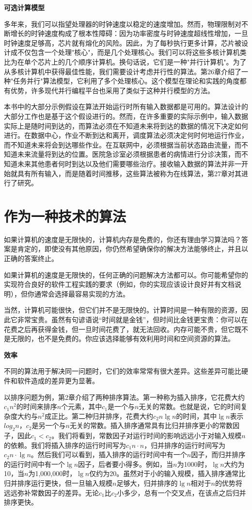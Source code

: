 \documentclass[lang=cn,newtx,10pt,scheme=chinese]{elegantbook}
\begin{document}
\textbf{可选计算模型}

多年来，我们可以指望处理器的时钟速度以稳定的速度增加。然而，物理限制对不断增长的时钟速度构成了根本性障碍：因为功率密度与时钟速度超线性增加，一旦时钟速度足够高，芯片就有熔化的风险。因此，为了每秒执行更多计算，芯片被设计成不仅包含一个处理"核心"，而是几个处理核心。我们可以将这些多核计算机类比为在单个芯片上的几个顺序计算机。换句话说，它们是一种"并行计算机"。为了从多核计算机中获得最佳性能，我们需要设计考虑并行性的算法。第26章介绍了一种"任务并行"算法模型，它利用了多个处理核心。这个模型在理论和实践的角度都有优势，许多现代并行编程平台也采用了类似于这种并行模型的方法。

本书中的大部分示例假设在算法开始运行时所有输入数据都是可用的。算法设计的大部分工作也是基于这个假设进行的。然而，在许多重要的实际示例中，输入数据实际上是随时间到达的，而算法必须在不知道未来将到达的数据的情况下决定如何进行。在数据中心，作业不断到达和离开，调度算法必须决定何时何地运行作业，而不知道未来将会到达哪些作业。在互联网中，必须根据当前状态路由流量，而不知道未来流量将到达的位置。医院急诊室必须根据患者的病情进行分诊决策，而不知道未来其他患者何时到达以及他们需要哪些治疗。接收输入数据的算法并非一开始就具有所有输入，而是随着时间推移，这些算法被称为在线算法，第27章对其进行了研究。

\section{作为一种技术的算法}

如果计算机的速度是无限快的，计算机内存是免费的，你还有理由学习算法吗？答案是肯定的，即使没有其他原因，你仍然希望确保你的解决方法能够终止，并且以正确的答案终止。

如果计算机的速度是无限快的，任何正确的问题解决方法都可以。你可能希望你的实现符合良好的软件工程实践的要求（例如，你的实现应该设计良好并有文档说明），但你通常会选择最容易实现的方法。

当然，计算机可能很快，但它们并不是无限快的。计算时间是一种有限的资源，因此它非常宝贵。虽然有句谚语说“时间就是金钱”，但时间比金钱更宝贵：你可以在花费之后再获得金钱，但一旦时间花费了，就无法回收。内存可能不贵，但它既不是无限的，也不是免费的。你应该选择能够有效利用时间和空间资源的算法。

\textbf{效率}

不同的算法用于解决同一问题时，它们的效率常常有很大差异。这些差异可能比硬件和软件造成的差异更为显著。

以排序问题为例，第2章介绍了两种排序算法。第一种称为插入排序，它花费大约$c_1n^2$的时间来排序$n$个元素，其中$c_1$是一个与$n$无关的常数。也就是说，它的时间复杂度大约与$n^2$成正比。第二种归并排序，花费大约$c_2n\lg n$的时间，其中$\lg n$表示$log_2n$，$c_2$是另一个与$n$无关的常数。插入排序通常具有比归并排序更小的常数因子，因此$c_1 < c_2$。我们将看到，常数因子对运行时间的影响远远小于对输入规模$n$的依赖。我们将插入排序的运行时间写为$c_1n \cdot n$，归并排序的运行时间写为$c_2n \cdot \lg n$。然后我们可以看到，插入排序的运行时间中有一个$n$因子，而归并排序的运行时间中有一个$\lg n$因子，后者要小得多。例如，当$n$为1000时，$\lg n$大约为10，当$n$为1,000,000时，$\lg n$仅约为20。虽然对于小的输入规模，插入排序通常比归并排序运行更快，但一旦输入规模$n$足够大，归并排序的$\lg n$相对于$n$的优势将远远弥补常数因子的差异。无论$c_1$比$c_2$小多少，总有一个交叉点，在该点之后归并排序更快。
\end{document}
